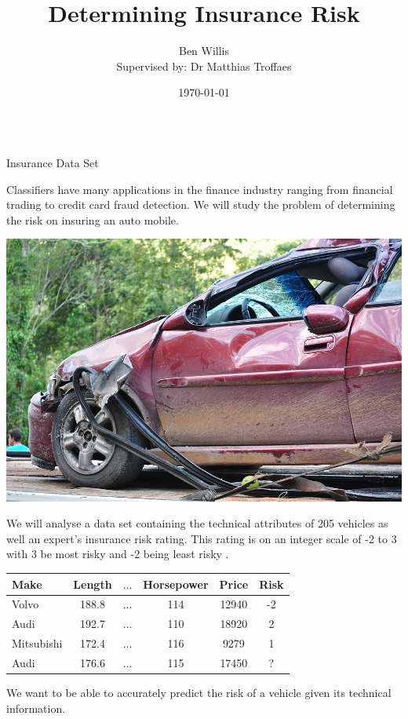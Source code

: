 \documentclass{beamer}
\title{Determining Insurance Risk}
\author[Ben Willis]{Ben Willis\\\normalsize{ Supervised by: Dr Matthias Troffaes}}
\institute{Durham University}
\date{\today}
\begin{document}
\begin{frame}
\begin{columns}
	\begin{column}{0.30\paperwidth}

		\begin{block}{Insurance Data Set}

			Classifiers have many applications in the finance industry ranging from financial trading to credit card fraud detection.
			We will study the problem of determining the risk on insuring an auto mobile. \vspace{0.5em}

			\begin{center}
				\includegraphics[width=.4\textwidth, keepaspectratio]{img/crash}
			\end{center}

			We will analyse a data set containing the technical attributes of 205 vehicles as well an expert's insurance risk rating.
			This rating is on an integer scale of -2 to 3 with 3 be most risky and -2 being least risky \cite{Automobile}.

			\begin{center}
				\begin{tabular}{l c c c c|c}
					Make       & Length & $\dots$ & Horsepower & Price & Risk \\
					\hline
					Volvo      & 188.8  & $\dots$ & 114        & 12940 & -2   \\
					Audi       & 192.7  & $\dots$ & 110        & 18920 & 2    \\
					Mitsubishi & 172.4  & $\dots$ & 116        & 9279  & 1    \\
					Audi       & 176.6  & $\dots$ & 115        & 17450 & ?
				\end{tabular}
			\end{center}

			We want to be able to accurately predict the risk of a vehicle given its technical information.
		\end{block}


\end{column}
\end{columns}
\end{frame}
\end{document}
